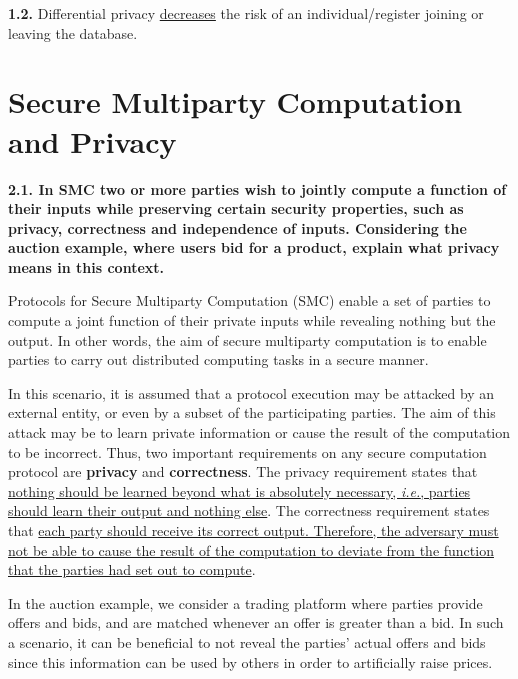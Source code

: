 \documentclass[a4paper, 11pt]{article}
\begin{document}
\vspace{\baselineskip}

\textbf{1.2.} Differential privacy \underline{decreases}
 the risk of an individual/register joining or leaving the database.

\vspace{2\baselineskip}

\section{Secure Multiparty Computation and Privacy}

\textbf{2.1. In SMC two or more parties wish to jointly compute a function of their inputs
while preserving certain security properties, such as privacy, correctness and independence
of inputs. Considering the auction example, where users bid for a product, explain what
privacy means in this context.}

\vspace{\baselineskip}

Protocols for Secure Multiparty Computation (SMC) enable a set of parties to compute a
joint function of their private inputs while revealing nothing but the output. In
other words, the aim of secure multiparty computation is to enable parties to carry
out distributed computing tasks in a secure manner.

In this scenario, it is assumed that a protocol execution may be attacked by an external
entity, or even by a subset of the participating parties. The aim of this attack may be to
learn private information or cause the result of the computation to be incorrect. Thus,
two important requirements on any secure computation protocol are \textbf{privacy} and
\textbf{correctness}. The privacy requirement states that \uline{nothing should be
learned beyond what is absolutely necessary, \textit{i.e.}, parties should learn their
output and nothing else}. The correctness requirement states that \uline{each party
should receive its correct output. Therefore, the adversary must not be able to cause
the result of the computation to deviate from the function that the parties had set
out to compute}.

In the auction example, we consider a trading platform where parties provide offers
and bids, and are matched whenever an offer is greater than a bid. In such a scenario,
it can be beneficial to not reveal the parties’ actual offers and bids since this
information can be used by others in order to artificially raise prices.
\end{document}
